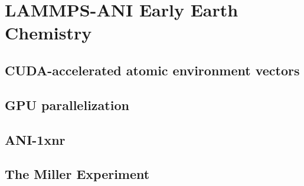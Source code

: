 \chapter{LAMMPS-ANI Early Earth Chemistry} 
\label{chapter4}

\section{CUDA-accelerated atomic environment vectors}

\section{GPU parallelization}

\section{ANI-1xnr}

\section{The Miller Experiment}

\cite{miller_experiment, prebiotic_compounds_EE_atmosphere, astroid_sample}